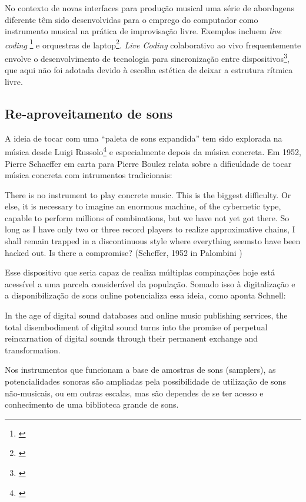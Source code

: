 No contexto de novas interfaces para produção musical uma série de abordagens diferente têm sido desenvolvidas para o emprego do computador como instrumento musical na prática de improvisação livre. Exemplos incluem \emph{live coding} \footnote{\cite{freeman2011collaborative}} e orquestras de laptop\footnote{\cite{Albert2012}}. \emph{Live Coding} colaborativo ao vivo frequentemente envolve o desenvolvimento de tecnologia para sincronização entre dispositivos\footnote{\cite{Wilson2014}}, que aqui não foi adotada devido à escolha estética de deixar a estrutura rítmica livre.


\subsection{Re-aproveitamento de sons}

A ideia de tocar com uma ``paleta de sons expandida'' tem sido explorada na música desde Luigi Russolo\footnote{\cite{Merz2013}} e especialmente depois da música concreta. Em 1952, Pierre Schaeffer em carta para Pierre Boulez relata sobre a dificuldade de tocar música concreta com intrumentos tradicionais: 

\begin{citacao}
There is no instrument to play concrete music. This is the biggest difficulty. Or else, it is necessary to imagine an enormous machine, of the cybernetic type, capable to perform millions of combinations, but we have not yet got there. So long as I have only two or three record players to realize approximative chains, I shall remain trapped in a discontinuous style where everything seemsto have been hacked out. Is there a compromise? (Scheffer, 1952 in Palombini \citeyear{Palombini1993})
\end{citacao}

Esse dispositivo que seria capaz de realiza múltiplas compinações hoje está acessível a uma parcela considerável da população. Somado isso à digitalização e a disponibilização de sons online potencializa essa ideia, como aponta Schnell:

\begin{citacao}
In the age of digital sound databases and online music publishing services, the total disembodiment of digital sound turns into the promise of perpetual reincarnation of digital sounds through their permanent exchange and transformation.\cite{Schnell2013}
\end{citacao}

Nos instrumentos que funcionam a base de amostras de sons (samplers), as potencialidades sonoras são ampliadas pela possibilidade de utilização de sons não-musicais, ou em outras escalas, mas são dependes de se ter acesso e conhecimento de uma biblioteca grande de sons. 

